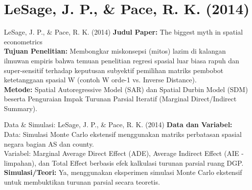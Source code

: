 \documentclass{beamer}
\begin{document}
\section{LeSage, J. P., \& Pace, R. K. (2014)}
\begin{frame}[allowframebreaks]{LeSage, J. P., \& Pace, R. K. (2014)}
\textbf{Judul Paper:} The biggest myth in spatial econometrics \\[0.3cm]
\textbf{Tujuan Penelitian:} Membongkar miskonsepsi (mitos) lazim di kalangan ilmuwan empiris bahwa temuan penelitian regresi spasial luar biasa rapuh dan super-sensitif terhadap keputusan subyektif pemilihan matriks pembobot ketetanggaan spasial W (contoh W orde-1 vs. Inverse Distance). \\[0.3cm]
\textbf{Metode:} Spatial Autoregressive Model (SAR) dan Spatial Durbin Model (SDM) beserta Penguraian Impak Turunan Parsial Iteratif (Marginal Direct/Indirect Summary).
\end{frame}

\begin{frame}[allowframebreaks]{Data \& Simulasi: LeSage, J. P., \& Pace, R. K. (2014)}
\textbf{Data dan Variabel:} Data: Simulasi Monte Carlo ekstensif menggunakan matriks perbatasan spasial negara bagian AS dan county.\\ Variabel: Marginal Average Direct Effect (ADE), Average Indirect Effect (AIE - limpahan), dan Total Effect berbasis efek kalkulasi turunan parsial ruang DGP. \\[0.3cm]
\textbf{Simulasi/Teori:} Ya, menggunakan eksperimen simulasi Monte Carlo ekstensif untuk membuktikan turunan parsial secara teoretis.
\end{frame}
\end{document}
